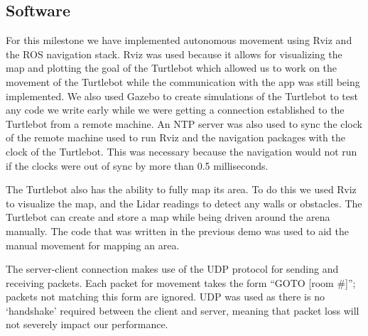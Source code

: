 \documentclass{article}
\begin{document}
\subsection{Software}
\par For this milestone we have implemented autonomous movement using Rviz and the ROS navigation stack. Rviz was used because it allows for visualizing the map and plotting the goal of the Turtlebot which allowed us to work on the movement of the Turtlebot while the communication with the app was still being implemented. We also used Gazebo to create simulations of the Turtlebot to test any code we write early while we were getting a connection established to the Turtlebot from a remote machine. An NTP server was also used to sync the clock of the remote machine used to run Rviz and the navigation packages with the clock of the Turtlebot. This was necessary because the navigation would not run if the clocks were out of sync by more than 0.5 milliseconds.
\par The Turtlebot also has the ability to fully map its area. To do this we used Rviz to visualize the map, and the Lidar readings to detect any walls or obstacles. The Turtlebot can create and store a map while being driven around the arena manually. The code that was written in the previous demo was used to aid the manual movement for mapping an area. 
\par The server-client connection makes use of the UDP protocol for sending and receiving packets. Each packet for movement takes the form ``GOTO [room \#]''; packets not matching this form are ignored. UDP was used as there is no `handshake' required between the client and server, meaning that packet loss will not severely impact our performance.
\end{document}
